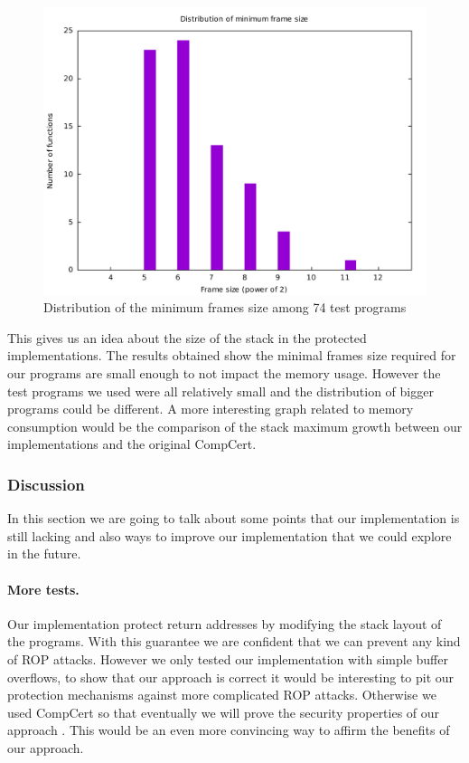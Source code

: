 \documentclass[11pt]{sdm}
\begin{document}
\begin{figure}[!ht]
\centering
\includegraphics[width=1\textwidth]{images/frame_size_graph.pdf}
\caption{Distribution of the minimum frames size among 74 test programs}
\label{frame_size_graph}
\end{figure}

This gives us an idea about the size of the stack in the protected implementations. The results obtained show the minimal frames size required for our programs are small enough to not impact the memory usage. However the test programs we used were all relatively small and the distribution of bigger programs could be different.
A more interesting graph related to memory consumption would be the comparison of the stack maximum growth between our implementations and the original CompCert. 

\subsubsection{Discussion}
\label{ssub:discussion}

In this section we are going to talk about some points that our implementation is still lacking and also ways to improve our implementation that we could explore in the future.

\paragraph{More tests.}
\label{par:More tests}
Our implementation protect return addresses by modifying the stack layout of the programs. With this guarantee we are confident that we can prevent any kind of ROP attacks. 
However we only tested our implementation with simple buffer overflows, to show that our approach is correct it would be interesting to pit our protection mechanisms against more complicated ROP attacks. Otherwise we used CompCert so that eventually we will prove the security properties of our approach . This would be an even more convincing way to affirm the benefits of our approach.
\end{document}
